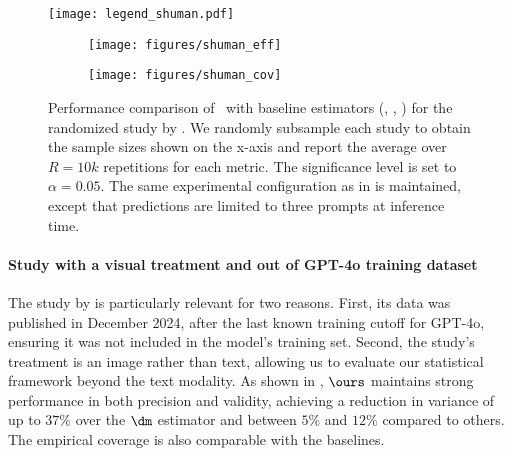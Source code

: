 \begin{figure*}[t!]
    \label{fig:appendix_results_1}
\end{figure*}

\begin{figure}
    \centering   \texttt{[image: legend\_shuman.pdf]}\vspace{2mm}\\
    \begin{subfigure}[t]{0.35\textwidth}
    \texttt{[image: figures/shuman\_eff]}
        \label{fig:shuman_eff}
    \end{subfigure}
        \hspace{30pt}
    \begin{subfigure}[t]{0.35\textwidth}
    \texttt{[image: figures/shuman\_cov]}
        \label{fig:shuman_cov}
    \end{subfigure}
    
    
    \caption{\small{Performance comparison of \ours~with baseline estimators (\ppct, \dm, \aipw) for the randomized study by \citet{shuman2024defend}. We randomly subsample each study to obtain the sample sizes shown on the x-axis and report the average over $R=10k$ repetitions for each metric. The significance level is set to $\alpha=0.05$. The same experimental configuration as in  is maintained, except that predictions are limited to three prompts at inference time.}}
    \label{fig:shuman_results}
    \end{figure}



\paragraph{Study with a visual treatment and out of GPT-4o training dataset}
\label{apx:image_treatment}

The study by \citet{shuman2024defend} is particularly relevant for two reasons. First, its data was published in December 2024, after the last known training cutoff for GPT-4o, ensuring it was not included in the model's training set. Second, the study's treatment is an image rather than text, allowing us to evaluate our statistical framework beyond the text modality. As shown in , $\ours$ maintains strong performance in both precision and validity, achieving a reduction in variance of up to $37\%$ over the $\dm$ estimator and between $5\%$ and $12\%$ compared to others. The empirical coverage is also comparable with the baselines.






